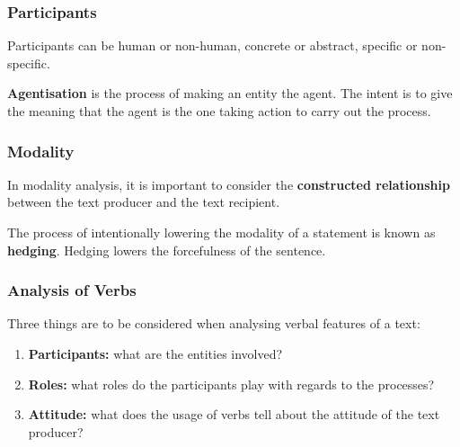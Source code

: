 \documentclass[../main.tex]{subfiles}
\begin{document}
	\subsubsection{Participants}
	Participants can be human or non-human, concrete or abstract, specific or non-specific.
	
	
	\textbf{Agentisation} is the process of making an entity the agent. The intent is to give the meaning that the agent is the one taking action to carry out the process. 
	
	\subsubsection{Modality}
	
	In modality analysis, it is important to consider the \textbf{constructed relationship} between the text producer and the text recipient.
	
	The process of intentionally lowering the modality of a statement is known as \textbf{hedging}. Hedging lowers the forcefulness of the sentence.
	

	\subsubsection{Analysis of Verbs}
	Three things are to be considered when analysing verbal features of a text:
	\begin{enumerate}
		\item \textbf{Participants:} what are the entities involved?
		\item \textbf{Roles:} what roles do the participants play with regards to the processes?
		\item \textbf{Attitude:} what does the usage of verbs tell about the attitude of the text producer?
	\end{enumerate}
\end{document}

